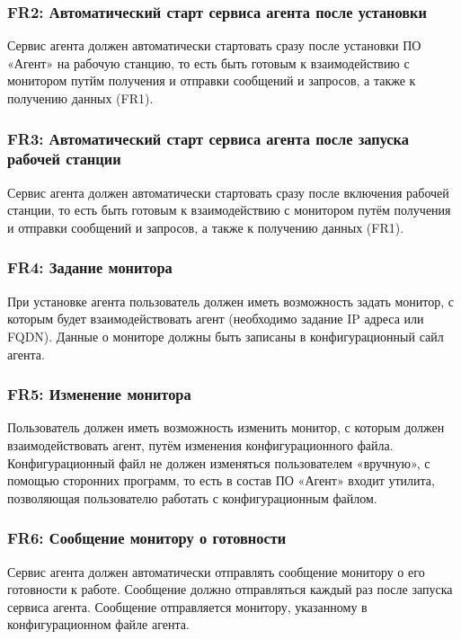 \subsubsection{FR2: Автоматический старт сервиса агента после установки}

Сервис агента должен автоматически стартовать сразу после установки ПО «Агент» на рабочую станцию, то есть быть готовым к взаимодействию с монитором путйм получения и отправки сообщений и запросов, а также к получению данных (FR1).

\subsubsection{FR3: Автоматический старт сервиса агента после запуска рабочей станции}

Сервис агента должен автоматически стартовать сразу после включения рабочей станции, то есть быть готовым к взаимодействию с монитором путём получения и отправки сообщений и запросов, а также к получению данных (FR1).

\subsubsection{FR4: Задание монитора}

При установке агента пользователь должен иметь возможность задать монитор, с которым будет взаимодействовать агент (необходимо задание IP адреса или FQDN). Данные о мониторе должны быть записаны в конфигурационный сайл агента.

\subsubsection{FR5: Изменение монитора}

Пользователь должен иметь возможность изменить монитор, с которым должен взаимодействовать агент, путём изменения конфигурационного файла. Конфигурационный файл не должен изменяться пользователем «вручную», с помощью сторонних программ, то есть в состав ПО «Агент» входит утилита, позволяющая пользователю работать с конфигурационным файлом.

\subsubsection{FR6: Сообщение монитору о готовности}

Сервис агента должен автоматически отправлять сообщение монитору о его готовности к работе. Сообщение должно отправляться каждый раз после запуска сервиса агента. Сообщение отправляется монитору, указанному в конфигурационном файле агента.


